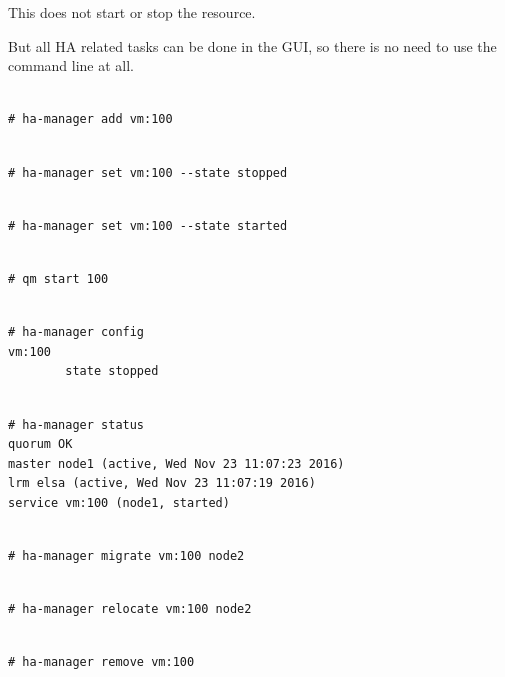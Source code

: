 This does not start or stop the resource.

But all HA related tasks can be done in the GUI, so there is no need to use the command line at all.

\begin{lstlisting}

# ha-manager add vm:100

\end{lstlisting}

\begin{lstlisting}

# ha-manager set vm:100 --state stopped

\end{lstlisting}

\begin{lstlisting}

# ha-manager set vm:100 --state started

\end{lstlisting}

\begin{lstlisting}

# qm start 100

\end{lstlisting}

\begin{lstlisting}

# ha-manager config
vm:100
        state stopped

\end{lstlisting}

\begin{lstlisting}

# ha-manager status
quorum OK
master node1 (active, Wed Nov 23 11:07:23 2016)
lrm elsa (active, Wed Nov 23 11:07:19 2016)
service vm:100 (node1, started)

\end{lstlisting}

\begin{lstlisting}

# ha-manager migrate vm:100 node2

\end{lstlisting}

\begin{lstlisting}

# ha-manager relocate vm:100 node2

\end{lstlisting}

\begin{lstlisting}

# ha-manager remove vm:100

\end{lstlisting}


